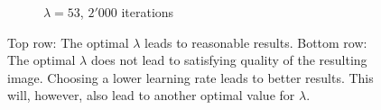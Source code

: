 \documentclass{paper}
\begin{document}
\begin{figure}[ht]
\begin{subfigure}[h]{0.45\textwidth}
	\caption*{$\lambda = 53$, $2'000$ iterations}
\end{subfigure}
\caption{Top row: The optimal $\lambda$ leads to reasonable results. Bottom row: The optimal $\lambda$ does not lead to satisfying quality of the resulting image. Choosing a lower learning rate leads to better results. This will, however, also lead to another optimal value for $\lambda$.}
\label{fig:optimal-lambda-images}
\end{figure}
 
\end{document}
